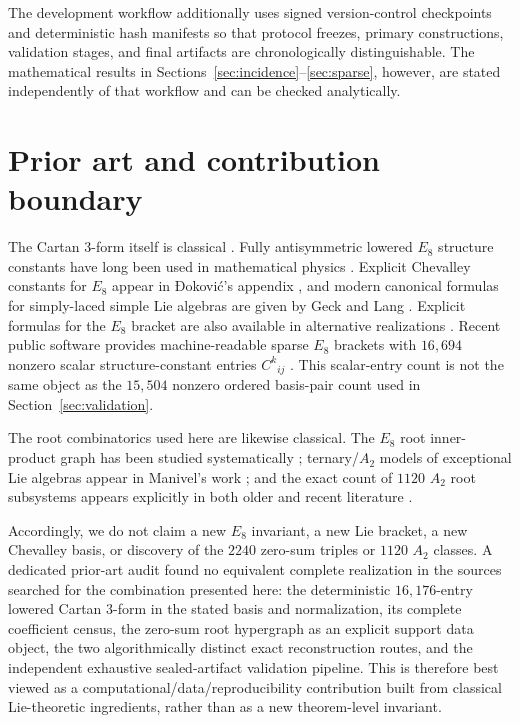 \documentclass[11pt]{article}
\theoremstyle{definition}
\theoremstyle{remark}
\begin{document}
The development workflow additionally uses signed version-control checkpoints and deterministic hash manifests so that protocol freezes, primary constructions, validation stages, and final artifacts are chronologically distinguishable.  The mathematical results in Sections~\ref{sec:incidence}--\ref{sec:sparse}, however, are stated independently of that workflow and can be checked analytically.

\section{Prior art and contribution boundary}\label{sec:priorart}

The Cartan 3-form itself is classical \cite{Le2013}.  Fully antisymmetric lowered $E_8$ structure constants have long been used in mathematical physics \cite{KoepsellNicolaiSamtleben1999}.  Explicit Chevalley constants for $E_8$ appear in Đoković's appendix \cite{Djokovic2000}, and modern canonical formulas for simply-laced simple Lie algebras are given by Geck and Lang \cite{GeckLang2025}.  Explicit formulas for the $E_8$ bracket are also available in alternative realizations \cite{Kollross2025}.  Recent public software provides machine-readable sparse $E_8$ brackets with $16{,}694$ nonzero scalar structure-constant entries $C^k{}_{ij}$ \cite{McGirl2026}.  This scalar-entry count is not the same object as the $15{,}504$ nonzero ordered basis-pair count used in Section~\ref{sec:validation}.

The root combinatorics used here are likewise classical.  The $E_8$ root inner-product graph has been studied systematically \cite{WinterVanLuijk2021}; ternary/$A_2$ models of exceptional Lie algebras appear in Manivel's work \cite{Manivel2006}; and the exact count of $1120$ $A_2$ root subsystems appears explicitly in both older and recent literature \cite{BordnerMantonSasaki2000,BohningBothmerMarquand2026}.

Accordingly, we do not claim a new $E_8$ invariant, a new Lie bracket, a new Chevalley basis, or discovery of the $2240$ zero-sum triples or $1120$ $A_2$ classes.  A dedicated prior-art audit found no equivalent complete realization in the sources searched for the combination presented here: the deterministic $16{,}176$-entry lowered Cartan 3-form in the stated basis and normalization, its complete coefficient census, the zero-sum root hypergraph as an explicit support data object, the two algorithmically distinct exact reconstruction routes, and the independent exhaustive sealed-artifact validation pipeline.  This is therefore best viewed as a computational/data/reproducibility contribution built from classical Lie-theoretic ingredients, rather than as a new theorem-level invariant.
\end{document}
